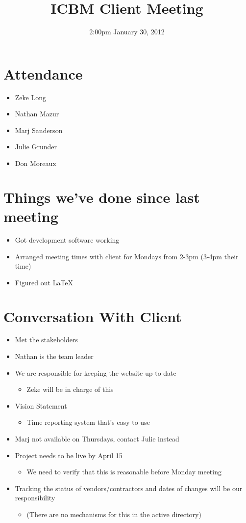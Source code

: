 \documentclass{article}
\begin{document}
\title{ICBM Client Meeting}
\date{2:00pm January 30, 2012}
\maketitle

\section{Attendance}
\begin{itemize}
\item Zeke Long
\item Nathan Mazur
\item Marj Sanderson
\item Julie Grunder
\item Don Moreaux
\end{itemize}

\section{Things we've done since last meeting}
\begin{itemize}
\item Got development software working
\item Arranged meeting times with client for Mondays from 2-3pm (3-4pm their time)
\item Figured out LaTeX
\end{itemize}

\section{Conversation With Client}
\begin{itemize}
\item Met the stakeholders
\item Nathan is the team leader
\item We are responsible for keeping the website up to date
	\begin{itemize}
	\item Zeke will be in charge of this
	\end{itemize}
\item Vision Statement
	\begin{itemize}
	\item Time reporting system that's easy to use
	\end{itemize}
\item Marj not available on Thursdays, contact Julie instead
\item Project needs to be live by April 15
	\begin{itemize}
	\item We need to verify that this is reasonable before Monday meeting
	\end{itemize}
\item Tracking the status of vendors/contractors and dates of changes will be our responsibility
	\begin{itemize}
        \item (There are no mechanisms for this in the active directory)
	\end{itemize}
\end{itemize}
\end{document}
